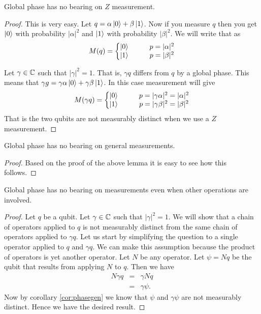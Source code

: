 \documentclass{article}
\begin{document}
\begin{lemma}
  Global phase has no bearing on $Z$ measurement.\label{lem:phasez}
  \begin{proof}
    This is very easy.
    Let $q=\alpha\ket{0}+\beta\ket{1}$. Now if you measure $q$
    then you get $\ket{0}$ with probability $|\alpha|^2$ and
    $\ket{1}$ with probability $|\beta|^2$. We will write that as
    \[
      M(q) = 
      \left\{
      \begin{matrix}
        \ket{0}&\quad&p=|\alpha|^2 \\
        \ket{1}&\quad&p=|\beta|^2
      \end{matrix}
      \right.
    \]

    Let $\gamma\in\mathbb{C}$ such that $|\gamma|^2=1$. That is,
    $\gamma q$ differs from $q$ by a global phase. This means
    that $\gamma g = \gamma\alpha\ket0 + \gamma\beta\ket1$. 
    In this case measurement will give
    \[
      M(\gamma q) = 
      \left\{
      \begin{matrix}
        \ket{0}&\quad&p=|\gamma\alpha|^2=|\alpha|^2 \\
        \ket{1}&\quad&p=|\gamma\beta|^2=|\beta|^2
      \end{matrix}
      \right.
    \]
    That is the two qubits are not measurably distinct when
    we use a $Z$ measurement.
  \end{proof}
\end{lemma}

\begin{corollary}
  Global phase has no bearing on general measurements.\label{cor:phasegen}
  \begin{proof}
    Based on the proof of the above lemma it is easy to see how this follows.
  \end{proof}
\end{corollary}

\begin{corollary}
  Global phase has no bearing on measurements even when other 
  operations are involved.
  \begin{proof}
    Let $q$ be a qubit. Let $\gamma\in\mathbb{C}$ such that $|\gamma|^2=1$.
    We will show that a chain of operators applied to $q$ is not
    measurably distinct from the same chain of operators applied to
    $\gamma q$. Let us start by simplifying the question to a single 
    operator applied to $q$ and $\gamma q$. We can make this assumption
    because the product of operators is yet another operator. Let 
    $N$ be any operator. Let $\psi = Nq$ be the qubit that results
    from applying $N$ to $q$. Then we have
    \begin{eqnarray*}
      N\gamma q &=& \gamma N q \\
      &=&\gamma\psi.
    \end{eqnarray*}
    Now by corollary \ref{cor:phasegen} we know that $\psi$ and 
    $\gamma\psi$ are not measurably distinct. Hence we have the 
    desired result.
  \end{proof}
\end{corollary}
\end{document}
